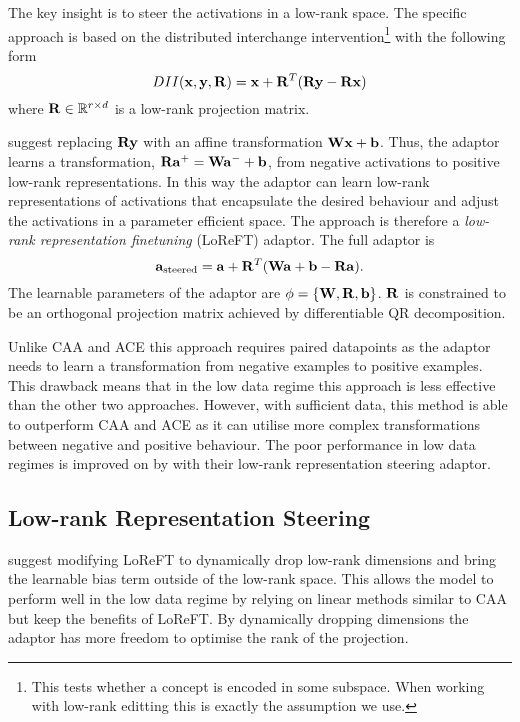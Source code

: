 The key insight is to steer the activations in a low-rank space.
The specific approach is based on the distributed interchange intervention\footnote{This tests whether a concept is encoded in some subspace. When working with low-rank editting this is exactly the assumption we use.} \cite{dii} with the following form
\begin{equation*}
    DII(\mathbf{x},\mathbf{y},\mathbf{R}) = \mathbf{x} + \mathbf{R}^T(\mathbf{R}\mathbf{y} - \mathbf{R}\mathbf{x})
\end{equation*}
where $\mathbf{R} \in \mathbb{R}^{r\times d}$ is a low-rank projection matrix.

\citet{reft} suggest replacing $\mathbf{R}\mathbf{y}$ with an affine transformation $\mathbf{W}\mathbf{x} + \mathbf{b}$.
Thus, the adaptor learns a transformation, $\mathbf{R}\mathbf{a}^+ = \mathbf{W}\mathbf{a}^- + \mathbf{b}$, from negative activations to positive low-rank representations.
In this way the adaptor can learn low-rank representations of activations that encapsulate the desired behaviour and adjust the activations in a parameter efficient space.
The approach is therefore a \textit{low-rank representation finetuning} (LoReFT) adaptor.
The full adaptor is
\begin{equation}
    \label{eq:loreft}
    \mathbf{a}_\text{steered} = \mathbf{a} + \mathbf{R}^T(\mathbf{W}\mathbf{a} + \mathbf{b} - \mathbf{R}\mathbf{a}).
\end{equation}
The learnable parameters of the adaptor are $\phi = \{\mathbf{W}, \mathbf{R}, \mathbf{b}\}$.
$\mathbf{R}$ is constrained to be an orthogonal projection matrix achieved by differentiable QR decomposition.

Unlike CAA \cite{caa} and ACE \cite{ace} this approach requires paired datapoints as the adaptor needs to learn a transformation from negative examples to positive examples.
This drawback means that in the low data regime this approach is less effective than the other two approaches.
However, with sufficient data, this method is able to outperform CAA and ACE as it can utilise more complex transformations between negative and positive behaviour.
The poor performance in low data regimes is improved on by \citet{steering-clear} with their low-rank representation steering adaptor.

\subsection{Low-rank Representation Steering}
\label{lorest}

\citet{steering-clear} suggest modifying LoReFT \cite{reft} to dynamically drop low-rank dimensions and bring the learnable bias term outside of the low-rank space.
This allows the model to perform well in the low data regime by relying on linear methods similar to CAA \cite{caa} but keep the benefits of LoReFT.
By dynamically dropping dimensions the adaptor has more freedom to optimise the rank of the projection.

